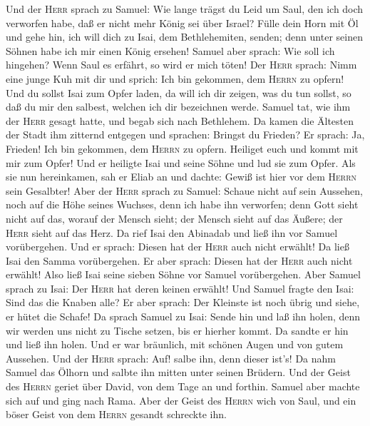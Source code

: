 Und der \textsc{Herr} sprach zu Samuel: Wie lange trägst
du Leid um Saul, den ich doch verworfen habe, daß er nicht mehr König
sei über Israel? Fülle dein Horn mit Öl und gehe hin, ich will dich zu
Isai, dem Bethlehemiten, senden; denn unter seinen Söhnen habe ich mir
einen König ersehen!  Samuel aber sprach: Wie soll ich
hingehen? Wenn Saul es erfährt, so wird er mich töten! Der \textsc{Herr}
sprach: Nimm eine junge Kuh mit dir und sprich: Ich bin gekommen, dem
\textsc{Herrn} zu opfern!  Und du sollst Isai zum Opfer
laden, da will ich dir zeigen, was du tun sollst, so daß du mir den
salbest, welchen ich dir bezeichnen werde.  Samuel tat,
wie ihm der \textsc{Herr} gesagt hatte, und begab sich nach Bethlehem.
Da kamen die Ältesten der Stadt ihm zitternd entgegen und sprachen:
Bringst du Frieden?  Er sprach: Ja, Frieden! Ich bin
gekommen, dem \textsc{Herrn} zu opfern. Heiliget euch und kommt mit mir
zum Opfer! Und er heiligte Isai und seine Söhne und lud sie zum Opfer.
 Als sie nun hereinkamen, sah er Eliab an und dachte:
Gewiß ist hier vor dem \textsc{Herrn} sein Gesalbter! 
Aber der \textsc{Herr} sprach zu Samuel: Schaue nicht auf sein Aussehen,
noch auf die Höhe seines Wuchses, denn ich habe ihn verworfen; denn Gott
sieht nicht auf das, worauf der Mensch sieht; der Mensch sieht auf das
Äußere; der \textsc{Herr} sieht auf das Herz.  Da rief
Isai den Abinadab und ließ ihn vor Samuel vorübergehen. Und er sprach:
Diesen hat der \textsc{Herr} auch nicht erwählt!  Da ließ
Isai den Samma vorübergehen. Er aber sprach: Diesen hat der
\textsc{Herr} auch nicht erwählt!  Also ließ Isai seine
sieben Söhne vor Samuel vorübergehen. Aber Samuel sprach zu Isai: Der
\textsc{Herr} hat deren keinen erwählt!  Und Samuel
fragte den Isai: Sind das die Knaben alle? Er aber sprach: Der Kleinste
ist noch übrig und siehe, er hütet die Schafe! Da sprach Samuel zu Isai:
Sende hin und laß ihn holen, denn wir werden uns nicht zu Tische setzen,
bis er hierher kommt.  Da sandte er hin und ließ ihn
holen. Und er war bräunlich, mit schönen Augen und von gutem Aussehen.
Und der \textsc{Herr} sprach: Auf! salbe ihn, denn dieser ist's!
 Da nahm Samuel das Ölhorn und salbte ihn mitten unter
seinen Brüdern. Und der Geist des \textsc{Herrn} geriet über David, von
dem Tage an und forthin. Samuel aber machte sich auf und ging nach Rama.
 Aber der Geist des \textsc{Herrn} wich von Saul, und ein
böser Geist von dem \textsc{Herrn} gesandt schreckte ihn.
